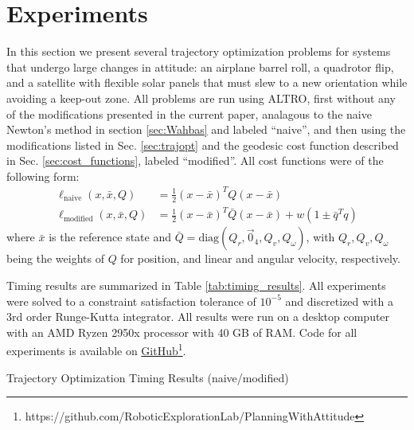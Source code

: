 \documentclass[letterpaper, 10 pt, conference]{ieeeconf}  %
\newcommand{\half}{\frac{1}{2}}
\newcommand{\todo}[1]{\textcolor{red}{TODO: #1}}
\begin{document}

\section{Experiments} \label{sec:experiments}
    In this section we present several trajectory optimization problems for systems that
    undergo large changes in attitude: an airplane barrel roll, a quadrotor flip, and a
    satellite with flexible solar panels that must slew to a new orientation while
    avoiding a keep-out zone.    
    All problems are run using ALTRO, first without any of the modifications presented in
    the current paper, analagous to the naive Newton's method in section \ref{sec:Wahbas}
    and labeled ``naive'', and then using the modifications listed in Sec.
    \ref{sec:trajopt} and the geodesic cost function described in Sec.
    \ref{sec:cost_functions}, labeled ``modified''. All cost functions were of the
    following form:
    \begin{align}
        \ell_\text{naive}(x, \bar{x}, Q) &= \half (x - \bar{x})^T Q (x - \bar{x}) \\
        \ell_\text{modified}(x, \bar{x}, Q) &= \half (x-\bar{x})^T \bar{Q} (x-\bar{x}) + w (1
            \pm \bar{q}^T q)
    \end{align}
    where $\bar{x}$ is the reference state and $\bar{Q} = \text{diag}(Q_r, \vec{0}_4,
    Q_v, Q_\omega)$, with $Q_r,Q_v,Q_\omega$ being the weights of $Q$ for position, and
    linear and angular velocity, respectively.
    
    Timing results are summarized in Table \ref{tab:timing_results}. All experiments were
    solved to a constraint satisfaction tolerance of $10^{-5}$ and discretized with a 3rd
    order Runge-Kutta integrator. All results were run on a desktop computer with an AMD
    Ryzen 2950x processor with 40 GB of RAM. Code for all experiments is available on
    \href{https://github.com/RoboticExplorationLab/PlanningWithAttitude}
    {GitHub\footnote{\url{https://github.com/RoboticExplorationLab/PlanningWithAttitude}}}.

    \begin{table}
        \centering
        
        \label{tab:timing_results}
        \caption{Trajectory Optimization Timing Results (naive/modified)}
    \end{table}
        
\end{document}
